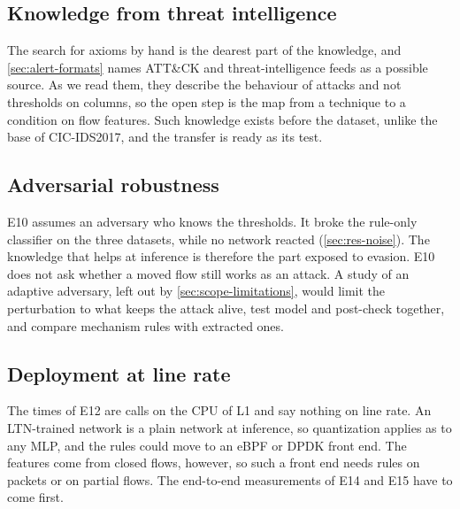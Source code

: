 \subsection{Knowledge from threat intelligence}
\label{sec:fw-attack}

The search for axioms by hand is the dearest part of the knowledge, and \cref{sec:alert-formats}
names ATT\&CK and threat-intelligence feeds as a possible source. As we read them, they describe the
behaviour of attacks and not thresholds on columns, so the open step is the map from a technique to a condition on
flow features. Such knowledge exists before the dataset, unlike the base of CIC-IDS2017, and the
transfer is ready as its test.

\subsection{Adversarial robustness}
\label{sec:fw-adversarial}

E10 assumes an adversary who knows the thresholds. It broke the rule-only classifier on the three
datasets, while no network reacted (\cref{sec:res-noise}). The
knowledge that helps at inference is therefore the part exposed to evasion. E10 does not ask whether
a moved flow still works as an attack. A study of an adaptive adversary, left out by
\cref{sec:scope-limitations}, would limit the perturbation to what keeps the attack alive, test model
and post-check together, and compare mechanism rules with extracted ones.

\subsection{Deployment at line rate}
\label{sec:fw-line-rate}

The times of E12 are calls on the CPU of L1 and say nothing on line rate. An LTN-trained
network is a plain network at inference, so quantization applies as to any MLP, and the rules
could move to an eBPF or DPDK front end. The
features come from closed flows, however, so such a front end needs rules on packets or on partial
flows. The end-to-end measurements of E14 and E15 have to come first.
